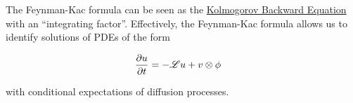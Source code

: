 \begin{remark}
  The Feynman-Kac formula can be seen as the
  \hyperref[thm:kbe]{Kolmogorov Backward Equation} with an
  ``integrating factor''. Effectively, the Feynman-Kac formula
  allows us to identify solutions of PDEs of the form

  \begin{align*}
    \frac{\partial u}{\partial t} &= - \mathscr{L}u + v\otimes\phi
  \end{align*}

  with conditional expectations of diffusion processes.
\end{remark}

